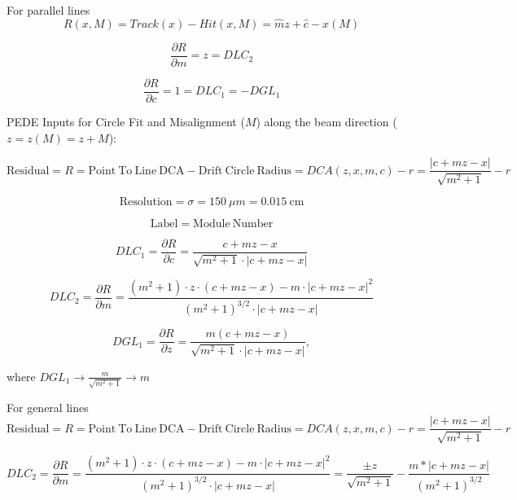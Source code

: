\documentclass[a4paper,11pt]{article}
\begin{document}
\clearpage
For parallel lines
\begin{equation}
R(x,M) = Track(x) - Hit(x,M) = \hat{m}z+\hat{c} - x(M)	
\end{equation}

\begin{equation}
\frac{ \partial R}{\partial m} = z	= DLC_2
\end{equation}

\begin{equation}
\frac{ \partial R}{\partial c} = 1	=DLC_1 = - DGL_1
\end{equation}

\clearpage

PEDE Inputs for Circle Fit and Misalignment ($M$) along the beam direction ($z=z(M)=z+M$):


\begin{equation}	
\mathrm{Residual}= R =\mathrm{Point \ To \ Line \ DCA} - \mathrm{Drift \ Circle \ Radius} = DCA(z,x,m,c) - r = \frac{ |c+mz-x| }  { \sqrt{m^2+1} } -r
\end{equation}


\begin{equation}	
\mathrm{Resolution} = \sigma = 150 \ \mu m = 0.015 \ \mathrm{cm}
\end{equation}

\begin{equation}	
\mathrm{Label}= \mathrm{Module \ Number}
\end{equation}

\begin{equation}
DLC_1 = \frac{\partial R}{\partial c} = \frac{ c+mz-x }  { \sqrt{m^2+1} \cdot |c+mz-x| }
\end{equation}

\begin{equation}
DLC_2 = \frac{ \partial R}{\partial m} = \frac{ (m^2+1)\cdot z\cdot(c+mz-x) - m\cdot |c+mz-x|^2 }{ (m^2+1)^{3/2} \cdot |c+mz-x|  }
\end{equation}

\begin{equation}	
DGL_1 = \frac{\partial R}{\partial z} = \frac{ m(c+mz-x) }  { \sqrt{m^2+1} \cdot |c+mz-x| },
\end{equation}

 where $DGL_1 \rightarrow \frac{m}{\sqrt{m^2+1}} \rightarrow m$


\clearpage


For general lines
\begin{equation}	
\mathrm{Residual}= R =\mathrm{Point \ To \ Line \ DCA} - \mathrm{Drift \ Circle \ Radius} = DCA(z,x,m,c) - r = \frac{ |c+mz-x| }  { \sqrt{m^2+1} } -r
\end{equation}


\begin{equation}
DLC_2 = \frac{ \partial R}{\partial m} = \frac{ (m^2+1)\cdot z\cdot(c+mz-x) - m\cdot |c+mz-x|^2 }{ (m^2+1)^{3/2} \cdot |c+mz-x|  } = \frac{\pm z}{\sqrt{m^2+1}} - \frac{m*|c+mz-x|}{(m^2+1)^{3/2}}
\end{equation}

\nocite{*}
\thispagestyle{plain}
%
\end{document}
